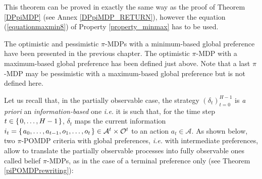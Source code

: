 This theorem can be proved in exactly the same way as the proof of Theorem \ref{DPpiMDP}
(see Annex \ref{DPpiMDP_RETURN}),
however the equation (\ref{equationmaxmin8}) of Property \ref{property_minmax} has to be used.

The optimistic and pessimistic $\pi$-MDPs with a minimum-based global preference
have been presented in the previous chapter.
The optimistic $\pi$-MDP with a maximum-based global preference has been defined just above.
Note that a last $\pi$-MDP may be pessimistic with a maximum-based global preference
but is not defined here.

Let us recall that, in the partially observable case, 
the strategy $(\delta_t)_{t=0}^{H-1}$ 
is \textit{a priori} an \textit{information-based} one
\textit{i.e.} it is such that, for the time step $t \in \left\{ \left. 0,\ldots,H-1 \right. \right\}$, 
$\delta_t$ maps the current information 
$i_t = \left\{ \left.  a_0,\ldots,a_{t-1}, o_1, \ldots,o_t  \right. \right\}
\in \mathcal{A}^t \times \mathcal{O}^t$
to an action $a_t \in \mathcal{A}$.
As shown below, two $\pi$-POMDP criteria with global preferences,
\textit{i.e.} with intermediate preferences, 
allow to translate the partially observable processes 
into fully observable ones called belief $\pi$-MDPs,
as in the case of a terminal preference only (see Theorem \ref{piPOMDPrewriting}):
